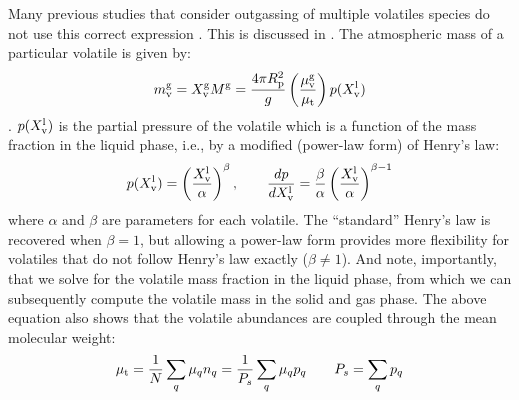 Many previous studies that consider outgassing of multiple volatiles species do not use this correct expression \citep[e.g.,][]{ET08,LMC13,SMD17,NKT19}.  This is discussed in \cite{BKW19}.  The  atmospheric mass of a particular volatile is given by:
\begin{equation}
m_{\rm v}^{\rm g} = X_{\rm v}^{\rm g} M^{\rm g} = \frac{4 \pi R_{\rm p}^2}{g} \left( \frac{\mu_{\rm v}^{\rm g}}{\mu_{\rm t}} \right) p (X_{\rm v}^{\rm l})
\end{equation}
.  $p(X_{\rm v}^{\rm l})$ is the partial pressure of the volatile which is a function of the mass fraction in the liquid phase, i.e., by a modified (power-law form) of Henry's law:
\begin{equation}
p( X_{\rm v}^{\rm l} ) = \left( \frac{X_{\rm v}^{\rm l}}{\alpha} \right)^\beta, \qquad \frac{dp}{d X_{\rm v}^{\rm l}} = \frac{\beta}{\alpha} \left( \frac{X_{\rm v}^{\rm l}}{\alpha} \right)^{\beta-1}
\end{equation}
where $\alpha$ and $\beta$ are parameters for each volatile.  The ``standard'' Henry's law is recovered when $\beta=1$, but allowing a power-law form provides more flexibility for volatiles that do not follow Henry's law exactly ($\beta \neq 1$).  
And note, importantly, that we solve for the volatile mass fraction in the liquid phase, from which we can subsequently compute the volatile mass in the solid and gas phase.  The above equation also shows that the volatile abundances are coupled through the mean molecular weight:
\begin{equation}
\mu_{\rm t} = \frac{1}{N} \sum_q \mu_q n_q = \frac{1}{P_s} \sum_q \mu_q p_q \qquad P_s = \sum_q p_q
\label{eq:atmosphere_molar_mass}
\end{equation}
